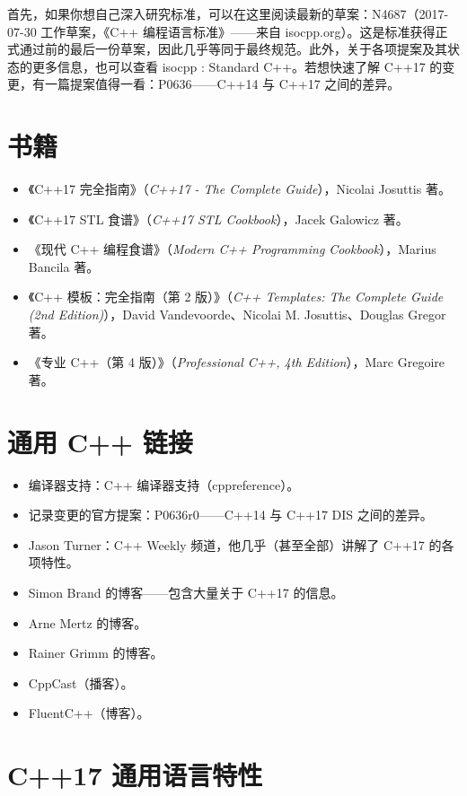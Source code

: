 首先，如果你想自己深入研究标准，可以在这里阅读最新的草案：N4687（2017-07-30 工作草案，《C++ 编程语言标准》——来自 isocpp.org）。这是标准获得正式通过前的最后一份草案，因此几乎等同于最终规范。此外，关于各项提案及其状态的更多信息，也可以查看 isocpp : Standard C++。若想快速了解 C++17 的变更，有一篇提案值得一看：P0636——C++14 与 C++17 之间的差异。

\section{书籍}

\begin{itemize}
\item 《C++17 完全指南》（\emph{C++17 - The Complete Guide}），Nicolai Josuttis 著。
\item 《C++17 STL 食谱》（\emph{C++17 STL Cookbook}），Jacek Galowicz 著。
\item 《现代 C++ 编程食谱》（\emph{Modern C++ Programming Cookbook}），Marius Bancila 著。
\item 《C++ 模板：完全指南（第 2 版）》（\emph{C++ Templates: The Complete Guide (2nd Edition)}），David Vandevoorde、Nicolai M. Josuttis、Douglas Gregor 著。
\item 《专业 C++（第 4 版）》（\emph{Professional C++, 4th Edition}），Marc Gregoire 著。
\end{itemize}

\section{通用 C++ 链接}

\begin{itemize}
\item 编译器支持：C++ 编译器支持（cppreference）。
\item 记录变更的官方提案：P0636r0——C++14 与 C++17 DIS 之间的差异。
\item Jason Turner：C++ Weekly 频道，他几乎（甚至全部）讲解了 C++17 的各项特性。
\item Simon Brand 的博客——包含大量关于 C++17 的信息。
\item Arne Mertz 的博客。
\item Rainer Grimm 的博客。
\item CppCast（播客）。
\item FluentC++（博客）。
\end{itemize}

\section{C++17 通用语言特性}

